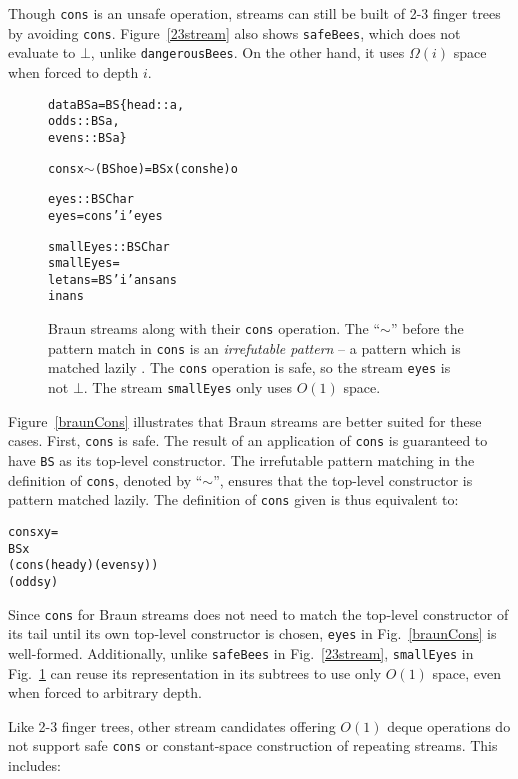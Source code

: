 \documentclass[envcountsect]{llncs}
\begin{document}
Though {\tt cons} is an unsafe operation, streams can still be built of 2-3 finger trees by avoiding {\tt cons}.
Figure~\ref{23stream} also shows {\tt safeBees}, which does not evaluate to $\bot$, unlike {\tt dangerousBees}.
On the other hand, it uses $\Omega(i)$ space when forced to depth $i$.

\begin{figure}
\begin{alltt}
data BS a = BS \{head::a, 
                odds::BS a, 
                evens::BS a\}

cons x \(\sim\)(BS h o e) = BS x (cons h e) o

eyes :: BS Char
eyes = cons 'i' eyes

smallEyes :: BS Char
smallEyes = 
  let ans = BS 'i' ans ans 
  in ans
\end{alltt}
\caption{
Braun streams along with their {\tt cons} operation.
The ``$\sim$'' before the pattern match in {\tt cons} is an {\em irrefutable pattern} -- a pattern which is matched lazily \cite{haskellReport}.
The {\tt cons} operation is safe, so the stream {\tt eyes} is not $\bot$.
The stream {\tt smallEyes} only uses $O(1)$ space.
}
\label{braunDef}
\label{braunCons}
\label{braunShare}
\end{figure}

Figure~\ref{braunCons} illustrates that Braun streams are better suited for these cases.
First, {\tt cons} is safe.
The result of an application of {\tt cons} is guaranteed to have {\tt BS} as its top-level constructor.
The irrefutable pattern matching in the definition of {\tt cons}, denoted by ``$\sim$'', ensures that the top-level constructor is pattern matched lazily.
The definition of {\tt cons} given is thus equivalent to:

\begin{alltt}
cons x y =
  BS x
     (cons (head y) (evens y))
     (odds y)
\end{alltt}

Since {\tt cons} for Braun streams does not need to match the top-level constructor of its tail until its own top-level constructor is chosen, {\tt eyes} in Fig.~\ref{braunCons} is well-formed.
Additionally, unlike {\tt safeBees} in Fig.~\ref{23stream}, {\tt smallEyes} in Fig.~\ref{braunShare} can reuse its representation in its subtrees to use only $O(1)$ space, even when forced to arbitrary depth.

Like 2-3 finger trees, other stream candidates offering $O(1)$ deque operations do not support safe {\tt cons} or constant-space construction of repeating streams. This includes:
\end{document}
